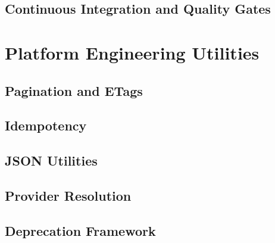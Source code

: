 \documentclass[a4paper,twoside]{sapthesis}
\begin{document}
\subsection{Continuous Integration and Quality Gates}

\section{Platform Engineering Utilities}
\label{sec:platform-utilities}

\subsection{Pagination and ETags}
\label{subsec:pagination}

\subsection{Idempotency}
\label{subsec:idempotency}

\subsection{JSON Utilities}
\label{subsec:json-utils}

\subsection{Provider Resolution}
\label{subsec:provider-resolution}

\subsection{Deprecation Framework}
\label{subsec:deprecation}
\end{document}

